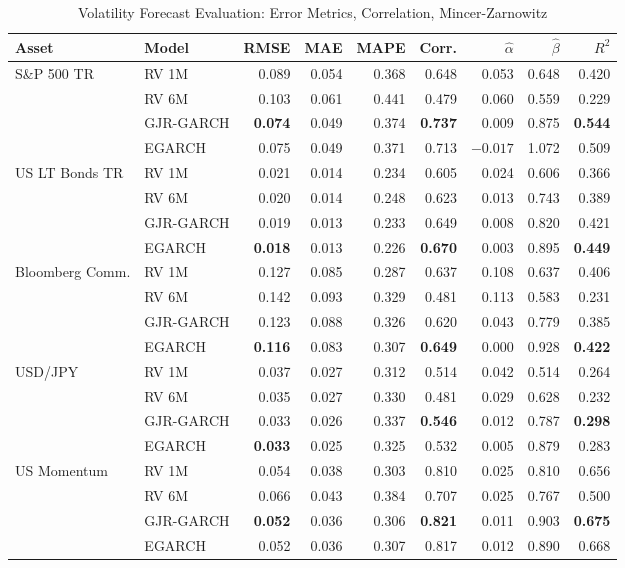\documentclass[12pt, a4paper]{article}
\begin{document}
\begin{table}[H]
\centering
\footnotesize
\caption{Volatility Forecast Evaluation: Error Metrics, Correlation, Mincer-Zarnowitz}
\label{tab:fc-eval}
\begin{tabular}{llrrrrrrr}
\toprule
\textbf{Asset} & \textbf{Model} & \textbf{RMSE} & \textbf{MAE} & \textbf{MAPE} & \textbf{Corr.} & $\hat\alpha$ & $\hat\beta$ & $R^2$\\
\midrule
\multirow{4}{*}{S\&P 500 TR}
& RV 1M       & 0.089 & 0.054 & 0.368 & 0.648 & 0.053 & 0.648 & 0.420\\
& RV 6M       & 0.103 & 0.061 & 0.441 & 0.479 & 0.060 & 0.559 & 0.229\\
& GJR-GARCH   & \textbf{0.074} & 0.049 & 0.374 & \textbf{0.737} & 0.009 & 0.875 & \textbf{0.544}\\
& EGARCH      & 0.075 & 0.049 & 0.371 & 0.713 & $-0.017$ & 1.072 & 0.509\\
\midrule
\multirow{4}{*}{US LT Bonds TR}
& RV 1M       & 0.021 & 0.014 & 0.234 & 0.605 & 0.024 & 0.606 & 0.366\\
& RV 6M       & 0.020 & 0.014 & 0.248 & 0.623 & 0.013 & 0.743 & 0.389\\
& GJR-GARCH   & 0.019 & 0.013 & 0.233 & 0.649 & 0.008 & 0.820 & 0.421\\
& EGARCH      & \textbf{0.018} & 0.013 & 0.226 & \textbf{0.670} & 0.003 & 0.895 & \textbf{0.449}\\
\midrule
\multirow{4}{*}{Bloomberg Comm.}
& RV 1M       & 0.127 & 0.085 & 0.287 & 0.637 & 0.108 & 0.637 & 0.406\\
& RV 6M       & 0.142 & 0.093 & 0.329 & 0.481 & 0.113 & 0.583 & 0.231\\
& GJR-GARCH   & 0.123 & 0.088 & 0.326 & 0.620 & 0.043 & 0.779 & 0.385\\
& EGARCH      & \textbf{0.116} & 0.083 & 0.307 & \textbf{0.649} & 0.000 & 0.928 & \textbf{0.422}\\
\midrule
\multirow{4}{*}{USD/JPY}
& RV 1M       & 0.037 & 0.027 & 0.312 & 0.514 & 0.042 & 0.514 & 0.264\\
& RV 6M       & 0.035 & 0.027 & 0.330 & 0.481 & 0.029 & 0.628 & 0.232\\
& GJR-GARCH   & 0.033 & 0.026 & 0.337 & \textbf{0.546} & 0.012 & 0.787 & \textbf{0.298}\\
& EGARCH      & \textbf{0.033} & 0.025 & 0.325 & 0.532 & 0.005 & 0.879 & 0.283\\
\midrule
\multirow{4}{*}{US Momentum}
& RV 1M       & 0.054 & 0.038 & 0.303 & 0.810 & 0.025 & 0.810 & 0.656\\
& RV 6M       & 0.066 & 0.043 & 0.384 & 0.707 & 0.025 & 0.767 & 0.500\\
& GJR-GARCH   & \textbf{0.052} & 0.036 & 0.306 & \textbf{0.821} & 0.011 & 0.903 & \textbf{0.675}\\
& EGARCH      & 0.052 & 0.036 & 0.307 & 0.817 & 0.012 & 0.890 & 0.668\\
\bottomrule
\end{tabular}
\end{table}
\end{document}
